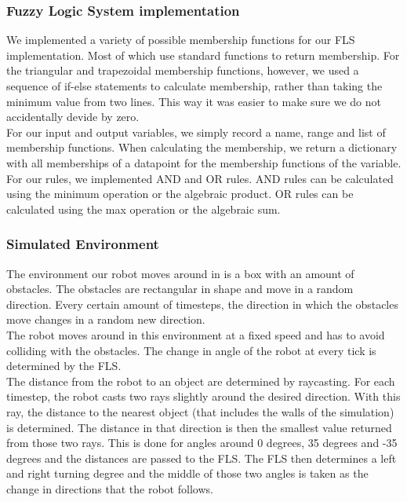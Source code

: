 \documentclass[conference]{IEEEtran}
\begin{document}
\subsubsection{Fuzzy Logic System implementation}
We implemented a variety of possible membership functions for our FLS implementation. Most of which use standard functions to return membership. For the triangular and trapezoidal membership functions, however, we used a sequence of if-else statements to calculate membership, rather than taking the minimum value from two lines. This way it was easier to make sure we do not accidentally devide by zero.\\
For our input and output variables, we simply record a name, range and list of membership functions. When calculating the membership, we return a dictionary with all memberships of a datapoint for the membership functions of the variable.\\
For our rules, we implemented AND and OR rules. AND rules can be calculated using the minimum operation or the algebraic product. OR rules can be calculated using the max operation or the algebraic sum.\\
\subsubsection{Simulated Environment}
The environment our robot moves around in is a box with an amount of obstacles. The obstacles are rectangular in shape and move in a random direction. Every certain amount of timesteps, the direction in which the obstacles move changes in a random new direction.\\
The robot moves around in this environment at a fixed speed and has to avoid colliding with the obstacles. The change in angle of the robot at every tick is determined by the FLS.\\
The distance from the robot to an object are determined by raycasting. For each timestep, the robot casts two rays slightly around the desired direction. With this ray, the distance to the nearest object (that includes the walls of the simulation) is determined. The distance in that direction is then the smallest value returned from those two rays. This is done for angles around 0 degrees, 35 degrees and -35 degrees and the distances are passed to the FLS. The FLS then determines a left and right turning degree and the middle of those two angles is taken as the change in directions that the robot follows.
\end{document}
